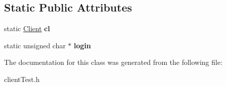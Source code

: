 \subsection*{Static Public Attributes}
\begin{DoxyCompactItemize}
\item 
\hypertarget{class_test_login_a03c25bc0f59c2365187e47c284ca1f92}{static \hyperlink{class_client}{Client} {\bfseries cl}}\label{class_test_login_a03c25bc0f59c2365187e47c284ca1f92}

\item 
\hypertarget{class_test_login_ab2c82263f9bf50d342ead96360353c07}{static unsigned char $\ast$ {\bfseries login}}\label{class_test_login_ab2c82263f9bf50d342ead96360353c07}

\end{DoxyCompactItemize}


The documentation for this class was generated from the following file\-:\begin{DoxyCompactItemize}
\item 
client\-Test.\-h\end{DoxyCompactItemize}
